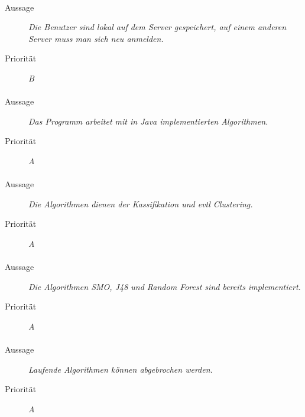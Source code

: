 \paragraph{}
\begin{description}
\item[Aussage] \textit{Die Benutzer sind lokal auf dem Server gespeichert, auf einem anderen Server muss man sich neu anmelden.}
\item[Priorität] \textit{B}
\end{description}

\paragraph{}
\begin{description}
\item[Aussage] \textit{Das Programm arbeitet mit in Java implementierten Algorithmen.}
\item[Priorität] \textit{A}
\end{description}

\paragraph{}
\begin{description}
\item[Aussage] \textit{Die Algorithmen dienen der Kassifikation und evtl Clustering.}
\item[Priorität] \textit{A}
\end{description}

\paragraph{}
\begin{description}
\item[Aussage] \textit{Die Algorithmen SMO, J48 und Random Forest sind bereits implementiert.}
\item[Priorität] \textit{A}
\end{description}

\paragraph{}
\begin{description}
\item[Aussage] \textit{Laufende Algorithmen können abgebrochen werden.}
\item[Priorität] \textit{A}
\end{description}

